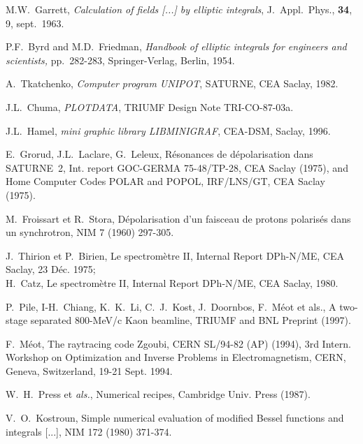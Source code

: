 \begin{thebibliography}{99}
\newpage

 M.W.~Garrett, \textsl{Calculation of
fields  [...] by elliptic integrals}, J.~Appl.~Phys., \textbf{34}, 9, sept.~1963.  

 P.F.~Byrd and M.D.~Friedman, \textsl{Handbook of elliptic integrals 
for engineers and scientists,} pp.~282-283, Springer-Verlag, Berlin, 1954.  

 A.~Tkatchenko, \textsl{Computer program UNIPOT}, SATURNE, CEA Saclay, 1982. 

 J.L.~Chuma, \textsl{PLOTDATA}, TRIUMF Design Note TRI-CO-87-03a.

 J.L.~Hamel, \textsl{mini graphic library LIBMINIGRAF}, CEA-DSM, Saclay, 1996.

 E.~Grorud, J.L.~Laclare, G.~Leleux, R\'esonances de d\'epolarisation dans SATURNE~2, 
Int. report GOC-GERMA 75-48/TP-28, CEA Saclay (1975), 
and Home Computer Codes POLAR and POPOL, IRF/LNS/GT, CEA Saclay (1975).

 M.~Froissart et R.~Stora, D\'epolarisation d'un faisceau de 
protons polaris\'es dans un synchrotron, NIM 7 (1960) 297-305.

 J.~Thirion et P.~Birien, Le spectrom\`etre II, Internal Report DPh-N/ME, 
CEA Saclay, 23 D\'ec. 1975; \\
H.~Catz, Le spectrom\`etre II, Internal Report DPh-N/ME, CEA Saclay, 1980. 

  P.~Pile, I-H.~Chiang, K.~K.~Li, C.~J.~Kost, J.~Doornbos, F.~M\'eot et als., 
A two-stage separated 800-MeV/c Kaon beamline,  TRIUMF and BNL Preprint (1997).

 F.~M\'eot, 
The raytracing code Zgoubi, CERN SL/94-82 (AP) (1994), 
3rd Intern. Workshop on Optimization and Inverse Problems 
in Electromagnetism, CERN, Geneva, Switzerland, 19-21 Sept. 1994. 

 W.~H.~Press et {\it als.}, Numerical recipes, Cambridge Univ. Press (1987).  

 V.~O.~Kostroun, Simple numerical evaluation of modified Bessel functions 
and integrals [...], NIM 172 (1980) 371-374. 

\end{thebibliography}

